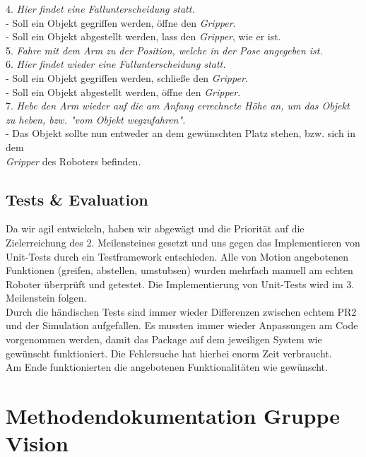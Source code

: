 \documentclass{suturo}
\newcommand\tab[1][1cm]{\hspace*{#1}}
\begin{document}
4. \textit{Hier findet eine Fallunterscheidung statt.}\\
\tab - Soll ein Objekt gegriffen werden, öffne den \textit{Gripper}.\\
\tab - Soll ein Objekt abgestellt werden, lass den \textit{Gripper}, wie er ist.\\

5. \textit{Fahre mit dem Arm zu der Position, welche in der Pose angegeben ist.}\\

6. \textit{Hier findet wieder eine Fallunterscheidung statt.}\\
\tab - Soll ein Objekt gegriffen werden, schließe den \textit{Gripper}.\\
\tab - Soll ein Objekt abgestellt werden, öffne den \textit{Gripper}.\\

7. \textit{Hebe den Arm wieder auf die am Anfang errechnete Höhe an, um das Objekt zu heben, bzw. "vom Objekt wegzufahren".}\\
\tab - Das Objekt sollte nun entweder an dem gewünschten Platz stehen, bzw. sich in dem\\ \tab \textit{Gripper} des Roboters befinden.


\subsection{Tests \& Evaluation}
Da wir agil entwickeln, haben wir abgewägt und die Priorität auf die Zielerreichung des 2.
Meilensteines gesetzt und uns gegen das Implementieren von Unit-Tests durch ein Testframework entschieden. Alle von Motion angebotenen Funktionen (greifen, abstellen, umstubsen) wurden mehrfach manuell am echten Roboter überprüft und getestet. Die Implementierung von Unit-Tests wird im 3. Meilenstein folgen. \\

Durch die händischen Tests sind immer wieder Differenzen zwischen echtem PR2 und der Simulation aufgefallen. Es mussten immer wieder Anpassungen am Code vorgenommen werden, damit das Package auf dem jeweiligen System wie gewünscht funktioniert. Die Fehlersuche hat hierbei enorm Zeit verbraucht. \\

Am Ende funktionierten die angebotenen Funktionalitäten wie gewünscht.\\

\newpage

\section*{Methodendokumentation Gruppe Vision}
\end{document}
